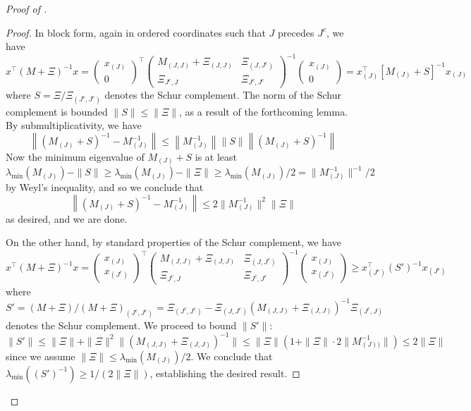 \documentclass{article} %
\begin{document}
\begin{proof}[Proof of ]
\begin{proof}
    In block form, again in ordered coordinates such that $J$ precedes $J^c$, we have
    \[
    x^\top (M+\Xi)^{-1}x = \begin{pmatrix}
        x_{(J)} \\
        0
    \end{pmatrix}^\top\begin{pmatrix}
        M_{(J,J)}+\Xi_{(J,J)} & \Xi_{(J,J^c)} \\
        \Xi_{J^c,J} & \Xi_{J^c,J^c}
    \end{pmatrix}^{-1} \begin{pmatrix}
        x_{(J)} \\ 0
    \end{pmatrix} = x_{(J)}^\top \left[M_{(J)} + S\right]^{-1}x_{(J)}
    \]
    where $S=\Xi / \Xi_{(J^c,J^c)}$ denotes the Schur complement. The norm of the Schur complement is bounded $\|S\|\leq \|\Xi\|$, as a result of the forthcoming lemma. By submultiplicativity, we have
    \[
    \left\|(M_{(J)}+S)^{-1}-M_{(J)}^{-1}\right\| \leq \left\| M_{(J)}^{-1}\right\| \|S\|\left\|(M_{(J)}+S)^{-1}\right\|
    \]
    Now the minimum eigenvalue of $M_{(J)}+S$ is at least $\lambda_{\min}(M_{(J)}) - \|S\| \geq \lambda_{\min}(M_{(J)})-\|\Xi\|\geq \lambda_{\min}(M_{(J)})/2=\|M_{(J)}^{-1}\|^{-1}/2$ by Weyl's inequality, and so we conclude that
    \[
    \left\|(M_{(J)}+S)^{-1}-M_{(J)}^{-1}\right\|\leq 2 \|M_{(J)}^{-1}\|^2 \|\Xi\|
    \]
    as desired, and we are done.

    On the other hand, by standard properties of the Schur complement, we have
    \[
    x^\top(M+\Xi)^{-1}x = \begin{pmatrix}
        x_{(J)} \\
        x_{(J^c)}
    \end{pmatrix}^\top\begin{pmatrix}
        M_{(J,J)}+\Xi_{(J,J)} & \Xi_{(J,J^c)} \\
        \Xi_{J^c,J} & \Xi_{J^c,J^c}
    \end{pmatrix}^{-1} \begin{pmatrix}
        x_{(J)} \\ x_{(J^c)}
    \end{pmatrix} \geq x_{(J^c)}^\top (S')^{-1}x_{(J^c)}
    \]
    where
    \[
    S'=(M+\Xi)/(M+\Xi)_{(J^c,J^c)} = \Xi_{(J^c,J^c)} - \Xi_{(J,J^c)}(M_{(J,J)}+\Xi_{(J,J)})^{-1}\Xi_{(J^c,J)} 
    \]
    denotes the Schur complement. We proceed to bound $\|S'\|$:
    \[
    \|S'\|\leq \|\Xi\| + \|\Xi\|^2\|(M_{(J,J)}+\Xi_{(J,J)})^{-1}\|\leq \|\Xi\|\left(1+\|\Xi\|\cdot 2\|M_{(J))}^{-1}\|\right)\leq 2\|\Xi\|
    \]
    since we assume $\|\Xi\|\leq \lambda_{\min}(M_{(J)})/2$. We conclude that $\lambda_{\min}((S')^{-1})\geq 1/(2\|\Xi\|)$, establishing the desired result.
\end{proof}


\end{proof}
\end{document}
